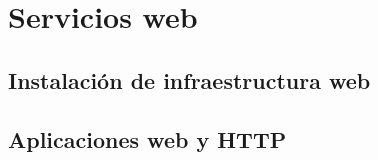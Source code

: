 \chapter{Servicios web}
\section{Instalación de infraestructura web}

\section{Aplicaciones web y HTTP}
